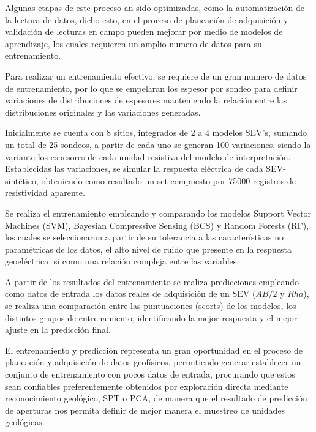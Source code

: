 Algunas etapas de este proceso an sido optimizadas, como la automatización de la lectura de datos, dicho esto, en el proceso de planeación de adquisición y validación de lecturas en campo pueden mejorar por medio de modelos de aprendizaje, los cuales requieren un amplio numero de datos para su entrenamiento.

Para realizar un entrenamiento efectivo, se requiere de un gran numero de datos de entrenamiento, por lo que se empelaran los espesor por sondeo para definir variaciones de distribuciones de espesores manteniendo la relación entre las distribuciones originales y las variaciones generadas.

Inicialmente se cuenta con 8 sitios, integrados de 2 a 4 modelos SEV's, sumando un total de 25 sondeos, a partir de cada uno se generan 100 variaciones, siendo la variante los espesores de cada unidad resistiva del modelo de interpretación.\ %
Establecidas las variaciones, se simular la respuesta eléctrica de cada SEV-sintético, obteniendo como resultado un set compuesto por 75000 registros de resistividad aparente.%

 
Se realiza el entrenamiento empleando y comparando los modelos Support Vector Machines (SVM), Bayesian Compressive Sensing (BCS) y Random Forests (RF), los cuales se  seleccionaron a partir de su tolerancia a las características no paramétricas de los datos, el alto nivel de ruido que presente en la respuesta geoeléctrica, si como una relación compleja entre las variables.%

A partir de los resultados del entrenamiento se realiza predicciones empleando como datos de entrada los datos reales de adquisición de un SEV ($AB/2$ y $Rha$),  se realiza una comparación entre las puntuaciones (scorts) de los modelos, los distintos grupos de entrenamiento, identificando la mejor respuesta y el mejor ajuste en la predicción final.

El entrenamiento y predicción representa un gran oportunidad en el proceso de planeación y adquisición de datos geofísicos, permitiendo generar establecer un conjunto de entrenamiento con pocos datos de entrada, procurando que estos sean confiables preferentemente obtenidos por exploración directa mediante reconocimiento geológico, SPT o PCA, de manera que el resultado de predicción de aperturas nos permita definir de mejor manera el muestreo de unidades geológicas. 








